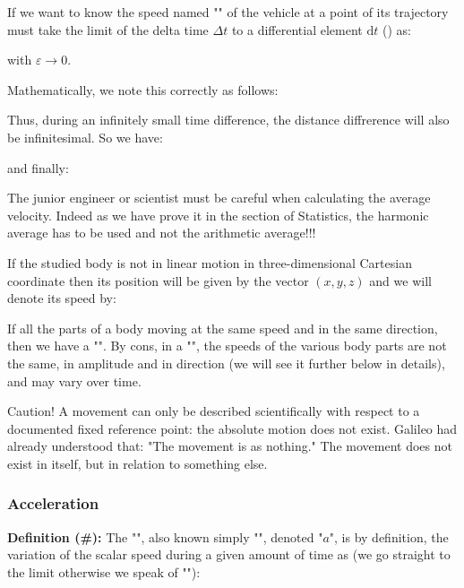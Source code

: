 	If we want to know the speed named "" of the vehicle at a point of its trajectory must take the limit of the delta time $\Delta t$ to a differential element $\mathrm{d}t$ () as:
	
	with $\varepsilon\rightarrow 0$.

	Mathematically, we note this correctly as follows:
	
	Thus, during an infinitely small time difference, the distance diffrerence will also be infinitesimal. So we have:
	
	and finally:
	
	The junior engineer or scientist must be careful when calculating the average velocity. Indeed as we have prove it in the section of Statistics, the harmonic average has to be used and not the arithmetic average!!!
	
	If the studied body is not in linear motion in three-dimensional Cartesian coordinate then its position will be given by the vector $(x,y,z)$ and we will denote its speed by:
	
	\begin{tcolorbox}[title=Remark,colframe=black,arc=10pt]
	If all the parts of a body moving at the same speed and in the same direction, then we have a "". By cons, in a "", the speeds of the various body parts are not the same, in amplitude and in direction (we will see it further below in details), and may vary over time.
	\end{tcolorbox}
	Caution! A movement can only be described scientifically with respect to a documented fixed reference point: the absolute motion does not exist. Galileo had already understood that: "The movement is as nothing." The movement does not exist in itself, but in relation to something else.
	
	\pagebreak
	\subsubsection{Acceleration}
	\textbf{Definition (\#\mydef):} The "", also known simply "", denoted "$a$", is by definition, the variation of the scalar speed during a given amount of time as (we go straight to the limit otherwise we speak of ""):
	
